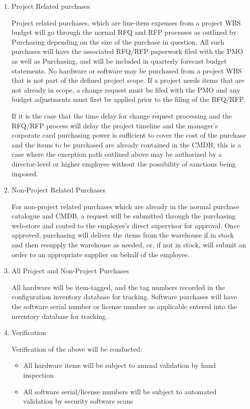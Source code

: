 \documentclass[stu]{apa7}
\begin{document}
\begin{enumerate}
\item Project Related purchases
\label{sec:org084ca8f}

Project related purchases, which are line-item expenses from a project WBS budget will go through the normal RFQ and RFP processes as outlined by Purchasing depending on the size of the purchase in question. All such purchases will have the associated RFQ/RFP paperwork filed with the PMO as well as Purchasing, and will be included in quarterly forecast budget statements. No hardware or software may be purchased from a project WBS that is not part of the defined project scope. If a project needs items that are not already in scope, a change request must be filed with the PMO and any budget adjustments must first be applied prior to the filing of the RFQ/RFP.

If it is the case that the time delay for change request processing and the RFQ/RFP process will delay the project timeline and the manager's corporate card purchasing power is sufficient to cover the cost of the purchase and the items to be purchased are already contained in the CMDB, this is a case where the exception path outlined above may be authorized by a director-level or higher employee without the possibility of sanctions being imposed.

\item Non-Project Related Purchases
\label{sec:org226fbcc}

For non-project related purchases which are already in the normal purchase catalogue and CMDB, a request will be submitted through the purchasing web-store and routed to the employee's direct supervisor for approval. Once approved, purchasing will deliver the items from the warehouse if in stock and then resupply the warehouse as needed, or, if not in stock, will submit an order to an appropriate supplier on behalf of the employee.

\item All Project and Non-Project Purchases
\label{sec:orga6144c9}

All hardware will be item-tagged, and the tag numbers recorded in the configuration inventory database for tracking. Software purchases will have the software serial number or license number as applicable entered into the inventory database for tracking.

\item Verification
\label{sec:org3fae020}

Verification of the above will be conducted:

\begin{itemize}
\item All hardware items will be subject to annual validation by hand inspection
\item All software serial/license numbers will be subject to automated validation by security software scans
\end{itemize}
\end{enumerate}
\end{document}
